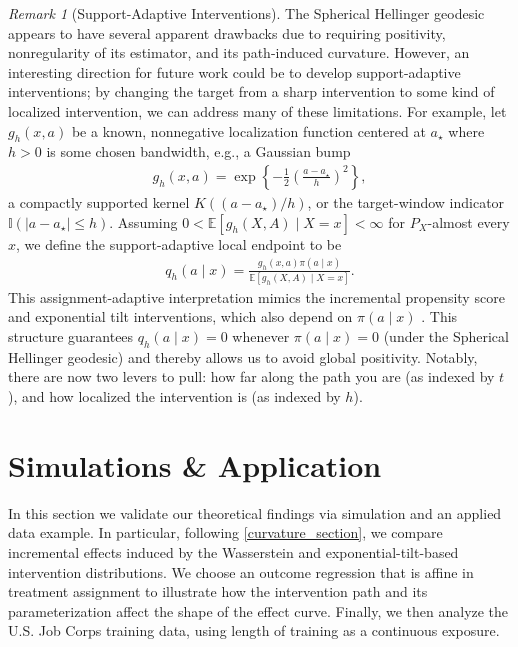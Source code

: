 \documentclass[11pt,twoside]{article}
\theoremstyle{definition}
\theoremstyle{remark}
\newtheorem{remark}{Remark}
\begin{document}
\begin{remark}[Support-Adaptive Interventions] The Spherical Hellinger geodesic appears to have several apparent drawbacks due to requiring positivity, nonregularity of its estimator, and its path-induced curvature. However, an interesting direction for future work could be to develop support-adaptive interventions; by changing the target from a sharp intervention to some kind of localized intervention, we can address many of these limitations. For example, let $g_h(x, a)$ be a known, nonnegative localization function centered at $a_{\star}$ where $h > 0$ is some chosen bandwidth, e.g., a Gaussian bump
\begin{align*}
    g_h(x, a) = \exp\left\{-\frac{1}{2}\left(\frac{a-a_{\star}}{h}\right)^2\right\},
\end{align*}
a compactly supported kernel $K((a-a_{\star})/h)$, or the target-window indicator $\mathbb{I}(|a-a_{\star}|\leq h)$. Assuming $0<\mathbb{E}[g_h(X,A)\mid X=x]<\infty$ for $P_X$-almost every $x$, we define the support-adaptive local endpoint to be
\begin{align} \label{adaptive_endpoint}
    q_{h}(a\!\mid\!x) = \frac{g_h(x, a)\pi(a\!\mid\!x)}{\mathbb{E}[g_h(X, A) \mid X = x]}.
\end{align}
This assignment-adaptive interpretation mimics the incremental propensity score and exponential tilt interventions, which also depend on $\pi(a \! \mid \! x)$ \citep{kennedy2019nonparametric, schindl2024incremental}. This structure guarantees $q_{h}(a\!\mid\!x) = 0$ whenever $\pi(a\!\mid\!x)=0$ (under the Spherical Hellinger geodesic) and thereby allows us to avoid global positivity. Notably, there are now two levers to pull: how far along the path you are (as indexed by $t$), and how localized the intervention is (as indexed by $h$).
    
\end{remark}

\section{Simulations \& Application} \label{simulation_section}

In this section we validate our theoretical findings via simulation and an applied data example. In particular, following \cref{curvature_section}, we compare incremental effects induced by the Wasserstein and exponential-tilt-based intervention distributions. We choose an outcome regression that is affine in treatment assignment to illustrate how the intervention path and its parameterization affect the shape of the effect curve. Finally, we then analyze the U.S. Job Corps training data, using length of training as a continuous exposure.
\end{document}
